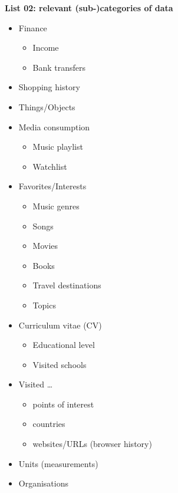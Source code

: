 \documentclass[12pt,english,a4paper,titlepage,cleardoublepage=empty,dottedtoc]{report}
\providecommand{\tightlist}{%
  \setlength{\itemsep}{0pt}\setlength{\parskip}{0pt}}
\begin{document}
\textbf{\protect\hypertarget{list-02_data-categories}{}{List 02:
relevant (sub-)categories of data}}

\begin{itemize}
\tightlist
\item
  Finance

  \begin{itemize}
  \tightlist
  \item
    Income
  \item
    Bank transfers
  \end{itemize}
\item
  Shopping history
\item
  Things/Objects
\item
  Media consumption

  \begin{itemize}
  \tightlist
  \item
    Music playlist
  \item
    Watchlist
  \end{itemize}
\item
  Favorites/Interests

  \begin{itemize}
  \tightlist
  \item
    Music genres
  \item
    Songs
  \item
    Movies
  \item
    Books
  \item
    Travel destinations
  \item
    Topics
  \end{itemize}
\item
  Curriculum vitae (CV)

  \begin{itemize}
  \tightlist
  \item
    Educational level
  \item
    Visited schools
  \end{itemize}
\item
  Visited \ldots{}

  \begin{itemize}
  \tightlist
  \item
    points of interest
  \item
    countries
  \item
    websites/URLs (browser history)
  \end{itemize}
\item
  Units (measurements)
\item
  Organisations


\end{itemize}
\end{document}
